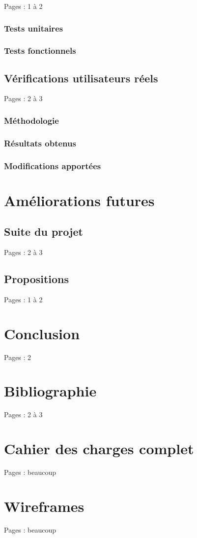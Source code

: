 \documentclass{eplmastersthesis_FR}
\begin{document}
			Pages : 1 à 2

			\subsection*{Tests unitaires}
			\subsection*{Tests fonctionnels}

		\section{Vérifications utilisateurs réels}

			Pages : 2 à 3

			\subsection*{Méthodologie}
			\subsection*{Résultats obtenus}
			\subsection*{Modifications apportées}

	\chapter{Améliorations futures}

		\section{Suite du projet}

			Pages : 2 à 3

		\section{Propositions}

			Pages : 1 à 2

	\chapter{Conclusion}

		Pages : 2

	\chapter*{Bibliographie}

		Pages : 2 à 3

	\appendix

	\chapter{Cahier des charges complet}

		Pages : beaucoup

	\chapter{Wireframes}

		Pages : beaucoup


	\backcoverpage
\end{document}
